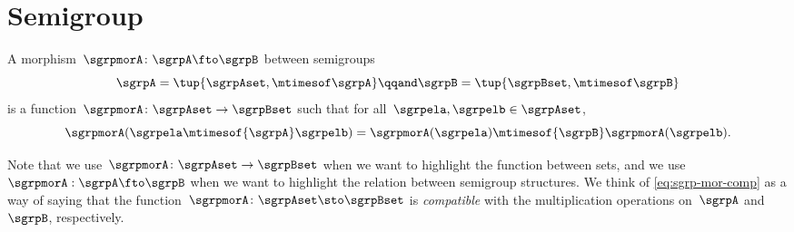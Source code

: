 

\section{Semigroup \wHomos}
\label{sec:semigroup-morphisms}



\begin{ctdefinition}
    \label{def:semigroup-mor}
    A morphism~$\sgrpmorA\colon \sgrpA \fto \sgrpB$ between semigroups
    \begin{equation}
        \label{eq:sgrpAB}
        \sgrpA = \tup{\sgrpAset, \mtimesof\sgrpA}
        \qqand
        \sgrpB = \tup{\sgrpBset, \mtimesof\sgrpB}
    \end{equation}
    is a function~$\sgrpmorA\colon \sgrpAset \to \sgrpBset$ such that for all~$\sgrpela, \sgrpelb \in \sgrpAset$,
    \begin{equation}
        \label{eq:sgrp-mor-comp}
        \sgrpmorA(\sgrpela \mtimesof{\sgrpA} \sgrpelb) = \sgrpmorA (\sgrpela) \mtimesof{\sgrpB} \sgrpmorA(\sgrpelb).
    \end{equation}
\end{ctdefinition}

Note that we use~$\sgrpmorA\colon \sgrpAset \to \sgrpBset$ when we want to highlight the function between sets, and we use~$\sgrpmorA: \sgrpA \fto \sgrpB$ when we want to highlight the relation between semigroup structures.
We think of \cref{eq:sgrp-mor-comp} as a way of saying that the function~$\sgrpmorA\colon \sgrpAset \sto \sgrpBset$  is \emph{compatible} with the multiplication operations on~$\sgrpA$ and~$\sgrpB$, respectively.


